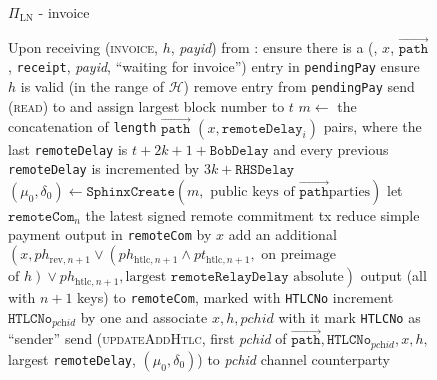 \begin{figure}[!htbp]
\begin{protocolbox}{$\Pi_{\mathrm{LN}}$ - invoice}
\begin{algorithmic}[1]
      \State Upon receiving (\textsc{invoice}, $h$, \textit{payid}) from \bob:
      \Indent
        \State ensure there is a (\bob, $x$, $\overrightarrow{\mathtt{path}}$,
        \texttt{receipt}, \textit{payid}, ``waiting for invoice'') entry in
        \texttt{pendingPay}
        \State ensure $h$ is valid (in the range of $\mathcal{H}$)
        \State remove entry from \texttt{pendingPay}
        \State send (\textsc{read}) to \ledger{} and assign largest block number
        to $t$
        \State $m \gets$ the concatenation of \texttt{length}
        $\overrightarrow{\mathtt{path}}$ $\left(x,
        \mathtt{remoteDelay}_i\right)$ pairs, where the last
        \texttt{remoteDelay} is $t + 2k + 1 + \mathtt{BobDelay}$ and every
        previous \texttt{remoteDelay} is incremented by $3k + \mathtt{RHSDelay}$
        \State $\left(\mu_0, \delta_0\right) \gets \mathtt{SphinxCreate}\left(m,
        \text{ public keys of } \overrightarrow{\mathtt{path}} \text{
        parties}\right)$
        \State let $\mathtt{remoteCom}_n$ the latest signed remote commitment tx
        \State reduce simple payment output in \texttt{remoteCom} by $x$
        \State add an additional $\left(x, ph_{\mathrm{rev}, n+1} \vee
        \left(ph_{\mathrm{htlc}, n+1} \wedge pt_{\mathrm{htlc}, n+1}, \text{ on
        preimage}\right.\right.$ $\left.\left.\text{of } h\right) \vee
        ph_{\mathrm{htlc}, n+1}, \text{largest } \mathtt{remoteRelayDelay}
        \text{ absolute}\right)$ output (all with $n+1$ keys) to
        \texttt{remoteCom}, marked with \texttt{HTLCNo}
        \State increment $\mathtt{HTLCNo}_{\textit{pchid}}$ by one and associate
        $x, h, \mathit{pchid}$ with it
        \State mark \texttt{HTLCNo} as ``sender''
        \State send (\textsc{updateAddHtlc}, first \textit{pchid} of
        $\overrightarrow{\mathtt{path}}, \mathtt{HTLCNo}_{\textit{pchid}}, x,
        h,$ largest \texttt{remoteDelay}, $\left(\mu_0, \delta_0\right)$) to
        \textit{pchid} channel counterparty
      \EndIndent
    \end{algorithmic}
  \end{protocolbox}
  \caption{}
  \label{alg:protocol:pay:invoice}
\end{figure}

